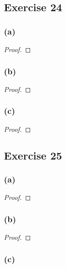 \documentclass[14pt]{extarticle}
\begin{document}
\subsection{Exercise 24}

\subsubsection{(a)}

\begin{proof}

\end{proof}

\subsubsection{(b)}

\begin{proof}

\end{proof}

\subsubsection{(c)}

\begin{proof}

\end{proof}

\subsection{Exercise 25}

\subsubsection{(a)}

\begin{proof}

\end{proof}

\subsubsection{(b)}

\begin{proof}

\end{proof}

\subsubsection{(c)}
\end{document}
